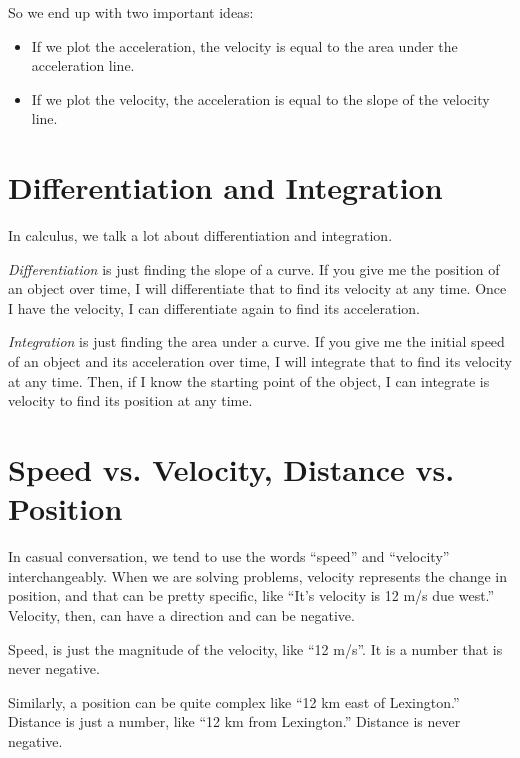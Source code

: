 So we end up with two important ideas:
\begin{itemize}
\item If we plot the acceleration, the velocity is equal to the area under the acceleration line.
\item If we plot the velocity, the acceleration is equal to the slope of the velocity line.
\end{itemize}

\section{Differentiation and Integration}

In calculus, we talk a lot about differentiation and integration.

\textit{Differentiation} is just finding the slope of a curve. If you give me
the position of an object over time, I will differentiate that to find
its velocity at any time. Once I have the velocity, I can differentiate
again to find its acceleration.

\textit{Integration} is just finding the area under a curve.  If you give me
the initial speed of an object and its acceleration over time, I will
integrate that to find its velocity at any time. Then, if I know the
starting point of the object, I can integrate is velocity to find its
position at any time.

\section{Speed vs. Velocity, Distance vs. Position}

In casual conversation, we tend to use the words ``speed'' and
``velocity'' interchangeably. When we are solving problems, velocity
represents the change in position, and that can be pretty specific,
like ``It's velocity is 12 m/s due west.'' Velocity, then, can
have a direction and can be negative.

Speed, is just the magnitude of the velocity, like ``12 m/s''.  It is
a number that is never negative.

Similarly, a position can be quite complex like ``12 km east of
Lexington.'' Distance is just a number, like ``12 km from Lexington.''
Distance is never negative.

